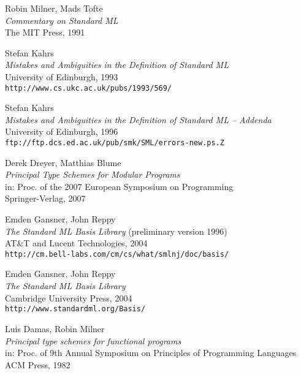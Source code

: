 \documentclass[twoside,titlepage]{article}
\newcommand{\void}[1]{}
\begin{document}
\begin{appendix}
\begin{thebibliography}{MTHM97}
Robin Milner, Mads Tofte \\
{\it Commentary on Standard ML} \\
The MIT Press, 1991

Stefan Kahrs \\
{\it Mistakes and Ambiguities in the Definition of Standard ML} \\
University of Edinburgh, 1993 \\
{\small\tt{http://www.cs.ukc.ac.uk/pubs/1993/569/}}

Stefan Kahrs \\
{\it Mistakes and Ambiguities in the Definition of Standard ML -- Addenda} \\
University of Edinburgh, 1996 \\
{\small\tt{ftp://ftp.dcs.ed.ac.uk/pub/smk/SML/errors-new.ps.Z}}

Derek Dreyer, Matthias Blume \\
{\it Principal Type Schemes for Modular Programs} \\
in: Proc. of the 2007 European Symposium on Programming \\
Springer-Verlag, 2007

\void{
\bibitem[DHCK06]{typeclasses}
Derek Dreyer, Robert Harper, Manuel Chakravarty, Gabriele Keller \\
{\it Modular Type Classes} \\
Draft, 2006 \\
{\small\tt{http://www.cs.cmu.edu/~rwh/papers/mtc/apr06.pdf}}
}

Emden Gansner, John Reppy \\
{\it The Standard ML Basis Library}
(preliminary version 1996) \\
AT\&T and Lucent Technologies, 2004 \\
{\small\tt{http://cm.bell-labs.com/cm/cs/what/smlnj/doc/basis/}}

Emden Gansner, John Reppy \\
{\it The Standard ML Basis Library} \\
Cambridge University Press, 2004 \\
{\small\tt{http://www.standardml.org/Basis/}}

Luis Damas, Robin Milner \\
{\it Principal type schemes for functional programs} \\
in: Proc. of 9th Annual Symposium on Principles of Programming Languages \\
ACM Press, 1982


\end{thebibliography}
\end{appendix}
\end{document}
